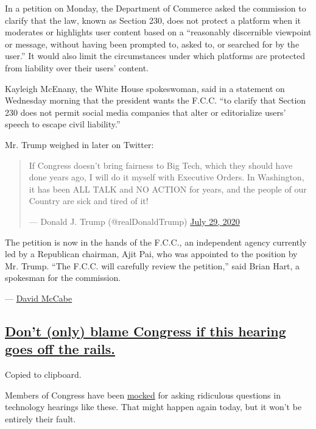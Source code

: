 In a petition on Monday, the Department of Commerce asked the commission
to clarify that the law, known as Section 230, does not protect a
platform when it moderates or highlights user content based on a
``reasonably discernible viewpoint or message, without having been
prompted to, asked to, or searched for by the user.'' It would also
limit the circumstances under which platforms are protected from
liability over their users' content.

Kayleigh McEnany, the White House spokeswoman, said in a statement on
Wednesday morning that the president wants the F.C.C. ``to clarify that
Section 230 does not permit social media companies that alter or
editorialize users' speech to escape civil liability.''

Mr. Trump weighed in later on Twitter:

\begin{quote}
If Congress doesn't bring fairness to Big Tech, which they should have
done years ago, I will do it myself with Executive Orders. In
Washington, it has been ALL TALK and NO ACTION for years, and the people
of our Country are sick and tired of it!

--- Donald J. Trump (@realDonaldTrump)
\href{https://twitter.com/realDonaldTrump/status/1288506554585505793?ref_src=twsrc\%5Etfw}{July
29, 2020}
\end{quote}

The petition is now in the hands of the F.C.C., an independent agency
currently led by a Republican chairman, Ajit Pai, who was appointed to
the position by Mr. Trump. ``The F.C.C. will carefully review the
petition,'' said Brian Hart, a spokesman for the commission.

--- \href{https://www.nytimes.com/by/david-mccabe}{David McCabe}

\hypertarget{dont-only-blame-congress-if-this-hearing-goes-off-the-rails}{%
\subsection{\texorpdfstring{\protect\hyperlink{dont-only-blame-congress-if-this-hearing-goes-off-the-rails}{Don't
(only) blame Congress if this hearing goes off the
rails.}}{Don't (only) blame Congress if this hearing goes off the rails.}}\label{dont-only-blame-congress-if-this-hearing-goes-off-the-rails}}

Copied to clipboard.

Members of Congress have been
\href{https://www.thewrap.com/senator-orrin-hatch-facebook-biz-model-zuckerberg/}{mocked}
for asking ridiculous questions in technology hearings like these. That
might happen again today, but it won't be entirely their fault.

